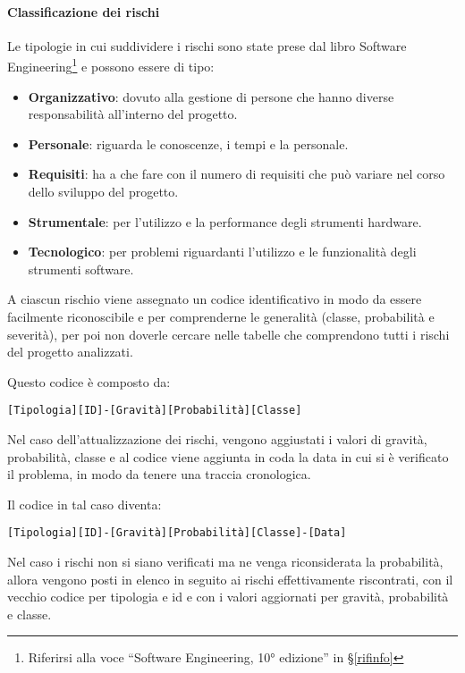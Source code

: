 			\paragraph{Classificazione dei rischi}\label{ClassificazioneRischi}
			Le tipologie in cui suddividere i rischi sono state prese dal libro Software
			Engineering\footnote{Riferirsi alla voce ``Software Engineering, 10° edizione'' in \S\ref{rifinfo}} e possono essere di tipo:
			\begin{itemize}
				\item \textbf{Organizzativo}: dovuto alla gestione di persone che hanno diverse responsabilità all'interno del progetto.
				\item \textbf{Personale}: riguarda le conoscenze, i tempi e la  personale.
				\item \textbf{Requisiti}: ha a che fare con il numero di requisiti che può variare nel corso dello sviluppo del progetto. %
				\item \textbf{Strumentale}: per l'utilizzo e la performance degli strumenti hardware.
				\item \textbf{Tecnologico}: per problemi riguardanti l'utilizzo e le funzionalità degli strumenti software.
			\end{itemize}

			A ciascun rischio viene assegnato un codice identificativo in modo da essere facilmente riconoscibile e per comprenderne le generalità
			(classe, probabilità e severità), per poi non doverle cercare nelle tabelle che comprendono tutti i rischi del progetto analizzati.

			Questo codice è composto da:

			\begin{center}
				\texttt{[Tipologia][ID]-[Gravità][Probabilità][Classe]}
			\end{center}

			Nel caso dell'attualizzazione dei rischi, vengono aggiustati i valori di gravità,
			probabilità, classe e al codice viene aggiunta in coda la data in cui si è verificato il problema, in modo da tenere una traccia cronologica.

			Il codice in tal caso diventa:

			\begin{center}
				\texttt{[Tipologia][ID]-[Gravità][Probabilità][Classe]-[Data]}
			\end{center}


			Nel caso i rischi non si siano verificati ma ne venga riconsiderata la probabilità, allora vengono posti in elenco in seguito ai rischi effettivamente
			riscontrati, con il vecchio codice per tipologia e id e con i valori aggiornati per gravità, probabilità e classe.

